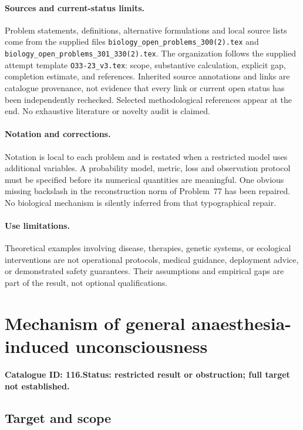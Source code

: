 \documentclass[11pt]{article}
\begin{document}
\paragraph{Sources and current-status limits.}
Problem statements, definitions, alternative formulations and local source lists
come from the supplied files
\texttt{biology\_open\_problems\_300(2).tex} and
\texttt{biology\_open\_problems\_301\_330(2).tex}.
The organization follows the supplied attempt template
\texttt{O33-23\_v3.tex}: scope, substantive calculation, explicit gap,
completion estimate, and references. Inherited source annotations and links are
catalogue provenance, not evidence that every link or current open status has
been independently rechecked. Selected methodological references appear at the
end. No exhaustive literature or novelty audit is claimed.

\paragraph{Notation and corrections.}
Notation is local to each problem and is restated when a restricted model uses
additional variables. A probability model, metric, loss and observation protocol
must be specified before its numerical quantities are meaningful. One obvious
missing backslash in the reconstruction norm of Problem~77 has been repaired.
No biological mechanism is silently inferred from that typographical repair.

\paragraph{Use limitations.}
Theoretical examples involving disease, therapies, genetic systems, or ecological
interventions are not operational protocols, medical guidance, deployment advice,
or demonstrated safety guarantees. Their assumptions and empirical gaps are part
of the result, not optional qualifications.

\setcounter{section}{115}
\section{Mechanism of general anaesthesia-induced unconsciousness}
\label{prob:116}
\noindent\textbf{Catalogue ID: 116.}\quad \textbf{Status: restricted result or obstruction; full target not established.}
\subsection{Target and scope}
\end{document}
